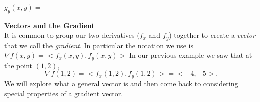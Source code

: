 \documentclass[11pt]{article}
\begin{document}
{{\item $g_y(x,y)=$
}
}



\newpage
{\bf Vectors and the Gradient} \\
It is common to group our two derivatives ($f_x$ and $f_y$) together to create a {\em vector} that we call the {\em gradient}. In particular the notation we use is $\nabla f(x,y)=<f_x(x,y),f_y(x,y)>$  In our previous example we saw that at the point $(1,2)$, $$\nabla f(1,2)=<f_x(1,2),f_y(1,2)>=<-4,-5>.$$ We will explore what a general vector is and then come back to considering  special properties of a gradient vector.\\
\end{document}

